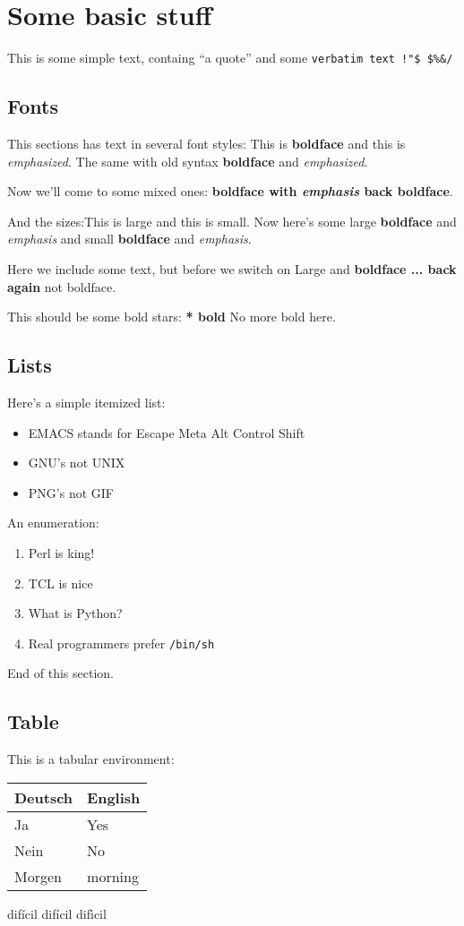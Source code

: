 
\section{Some basic stuff}

This is some simple text, containg ``a quote'' and
some \verb+verbatim text !"$ $%&/+

\subsection{Fonts}

This sections has text in several font styles: This is
\textbf{boldface} and this is \emph{emphasized}. The
same with old syntax {\bf boldface} and {\em emphasized}.

Now we'll come to some mixed ones: {\bf boldface with 
{\em emphasis} back boldface}.

And the sizes:{\large This is large} and {\small this is
small}. Now here's some {\large large {\bf boldface} and
{\em emphasis}} and {\small small {\bf boldface} and
{\em emphasis}}.

Here we include some text, but before we switch on 
{\Large Large and {\bf boldface
%
... back again} not boldface}.

This should be some bold stars: {\bf** bold} No more bold here.

\subsection{Lists}

Here's a simple itemized list:
\begin{itemize}
\item EMACS stands for Escape Meta Alt Control Shift
\item GNU's not UNIX
\item PNG's not GIF
\end{itemize}

An enumeration:

\begin{enumerate}
\item Perl is king!
\item TCL is nice
\item What is Python?
\item Real programmers prefer \texttt{/bin/sh}
\end{enumerate}

End of this section.

\subsection{Table}

This is a tabular environment:

\begin{tabular}{|ll|}
\hline
Deutsch & English \\
\hline\hline
Ja & Yes \\
Nein & No \\
Morgen & morning \\
\hline
\end{tabular}

dif\'{i}cil
dif{\'i}cil
dif\'{\i}cil
